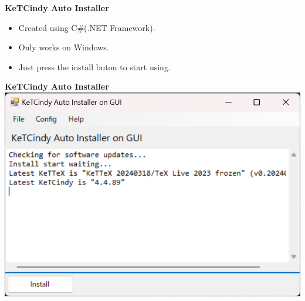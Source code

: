 \documentclass[dvipdfmx, unicode, 169]{beamer}
\begin{document}
\begin{frame}[t]{\bfseries KeTCindy Auto Installer}
  \begin{itemize}
    \item Created using C\#(.NET Framework).
    \item Only works on Windows.
    \item Just press the install buton to start using.
  \end{itemize}

\end{frame}

\begin{frame}{\bfseries KeTCindy Auto Installer}
  \includegraphics[width=1.0\linewidth]{img/AutoInstaller/installer_2.png}
\end{frame}
\end{document}
